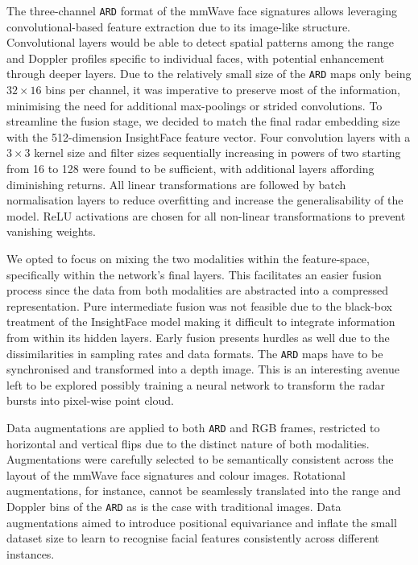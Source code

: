 \documentclass{mpaper}
\begin{document}
The three-channel \texttt{ARD} format of the mmWave face signatures allows leveraging convolutional-based feature extraction due to its image-like structure. Convolutional layers would be able to detect spatial patterns among the range and Doppler profiles specific to individual faces, with potential enhancement through deeper layers. Due to the relatively small size of the \texttt{ARD} maps only being $32 \times 16$ bins per channel, it was imperative to preserve most of the information, minimising the need for additional max-poolings or strided convolutions. To streamline the fusion stage, we decided to match the final radar embedding size with the 512-dimension InsightFace feature vector. Four convolution layers with a $3 \times 3$ kernel size and filter sizes sequentially increasing in powers of two starting from 16 to 128 were found to be sufficient, with additional layers affording diminishing returns. All linear transformations are followed by batch normalisation layers to reduce overfitting and increase the generalisability of the model. ReLU activations are chosen for all non-linear transformations to prevent vanishing weights.

We opted to focus on mixing the two modalities within the feature-space, specifically within the network's final layers. This facilitates an easier fusion process since the data from both modalities are abstracted into a compressed representation. Pure intermediate fusion was not feasible due to the black-box treatment of the InsightFace model making it difficult to integrate information from within its hidden layers. Early fusion presents hurdles as well due to the dissimilarities in sampling rates and data formats. The \texttt{ARD} maps have to be synchronised and transformed into a depth image. This is an interesting avenue left to be explored possibly training a neural network to transform the radar bursts into pixel-wise point cloud.

Data augmentations are applied to both \texttt{ARD} and RGB frames, restricted to horizontal and vertical flips due to the distinct nature of both modalities. Augmentations were carefully selected to be semantically consistent across the layout of the mmWave face signatures and colour images. Rotational augmentations, for instance, cannot be seamlessly translated into the range and Doppler bins of the \texttt{ARD} as is the case with traditional images. Data augmentations aimed to introduce positional equivariance and inflate the small dataset size to learn to recognise facial features consistently across different instances.
\end{document}
